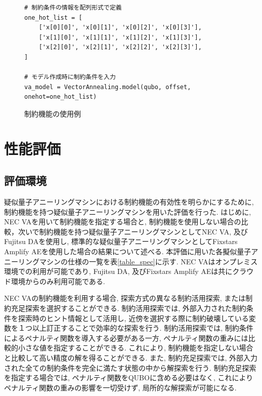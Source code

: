 \documentclass[submit,techrep,noauthor]{ipsj}
\newcounter{sourcecodefigure}
\newcounter{normalfigure}
\newcommand{\switchtosourcecode}{%
    \setcounter{normalfigure}{\value{figure}}
    \setcounter{figure}{\value{sourcecodefigure}}
}
\newcommand{\switchtonormal}{%
    \setcounter{sourcecodefigure}{\value{figure}}
    \setcounter{figure}{\value{normalfigure}}
}
\newcommand\sourcecodeposition{h}
\newenvironment{sourcecode}[1][h]{%
    \begin{figure}[#1]
    \renewcommand\sourcecodeposition{#1}
    \centering
    \captionsetup{name=ソースコード}
    \switchtosourcecode
    \ifthenelse{\equal{\sourcecodeposition}{t}}%
        {\vspace{-1.3zh}} %
        {\ifthenelse{\equal{\sourcecodeposition}{b}}%
            {\vspace{-2zh}} %
            {\vspace{-2zh}} %
    }
}{%
    \ifthenelse{\equal{\sourcecodeposition}{t}}%
        {\vspace{-1.3zh}} %
        {\ifthenelse{\equal{\sourcecodeposition}{b}}%
            {\vspace{-1zh}} %
            {\vspace{-3zh}} %
    }
    \switchtonormal
    \end{figure}
}
\begin{document}
\begin{sourcecode}[tb] %
\caption{制約機能の使用例}\label{code:nec_va}
\begin{lstlisting}
# 制約条件の情報を配列形式で定義
one_hot_list = [
    ['x[0][0]', 'x[0][1]', 'x[0][2]', 'x[0][3]'],
    ['x[1][0]', 'x[1][1]', 'x[1][2]', 'x[1][3]'],
    ['x[2][0]', 'x[2][1]', 'x[2][2]', 'x[2][3]'],
]

# モデル作成時に制約条件を入力
va_model = VectorAnnealing.model(qubo, offset, onehot=one_hot_list)
\end{lstlisting}
\vspace{5mm}
\end{sourcecode}

\section{性能評価}

\subsection{評価環境}
疑似量子アニーリングマシンにおける制約機能の有効性を明らかにするために, 制約機能を持つ疑似量子アニーリングマシンを用いた評価を行った. はじめに, NEC VAを用いて制約機能を指定する場合と, 制約機能を使用しない場合の比較，次いで制約機能を持つ疑似量子アニーリングマシンとしてNEC VA, 及びFujitsu DAを使用し, 標準的な疑似量子アニーリングマシンとしてFixstars Amplify AEを使用した場合の結果について述べる. 本評価に用いた各擬似量子アニーリングマシンの仕様の一覧を表\ref{table_spec}に示す. NEC VAはオンプレミス環境での利用が可能であり, Fujitsu DA, 及びFixstars Amplify AEは共にクラウ
ド環境からのみ利用可能である.

NEC VAの制約機能を利用する場合, 探索方式の異なる制約活用探索, または制約充足探索を選択することができる. 制約活用探索では, 外部入力された制約条件を探索時のヒント情報として活用し, 近傍を選択する際に制約破壊している変数を１つ以上訂正することで効率的な探索を行う. 制約活用探索では, 制約条件によるペナルティ関数を導入する必要がある一方, ペナルティ関数の重みには比較的小さな値を指定することができる. これにより, 制約機能を指定しない場合と比較して高い精度の解を得ることができる. また, 制約充足探索では, 外部入力された全ての制約条件を完全に満たす状態の中から解探索を行う. 制約充足探索を指定する場合では, ペナルティ関数をQUBOに含める必要はなく, これによりペナルティ関数の重みの影響を一切受けず, 局所的な解探索が可能になる.
\end{document}
